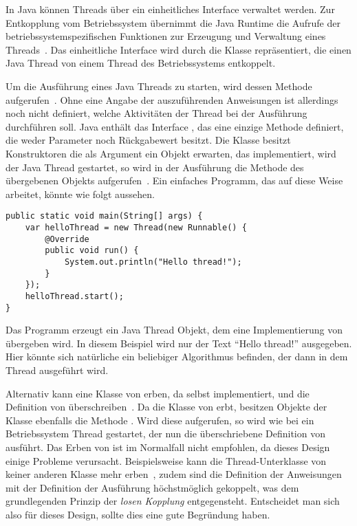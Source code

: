 In Java können Threads über ein einheitliches Interface verwaltet werden. Zur Entkopplung vom Betriebssystem übernimmt die Java Runtime die Aufrufe der betriebssystemspezifischen Funktionen zur Erzeugung und Verwaltung eines Threads~\cite[S.~3]{Friesen2015}. Das einheitliche Interface wird durch die Klasse  repräsentiert, die einen Java Thread von einem Thread des  Betriebssystems entkoppelt. 

Um die Ausführung eines Java Threads zu starten, wird dessen Methode  aufgerufen~\cite[S.~8]{Friesen2015}. Ohne eine Angabe der auszuführenden Anweisungen ist allerdings noch nicht definiert, welche Aktivitäten der Thread bei der Ausführung durchführen soll. Java enthält das Interface , das eine einzige Methode  definiert, die weder Parameter noch Rückgabewert besitzt. Die Klasse  besitzt Konstruktoren die als Argument ein Objekt erwarten, das  implementiert, wird der Java Thread gestartet, so wird in der Ausführung die  Methode des übergebenen Objekts aufgerufen~\cite[S.~3]{Friesen2015}. Ein einfaches Programm, das auf diese Weise arbeitet, könnte wie folgt aussehen.
\begin{lstlisting}
public static void main(String[] args) {
	var helloThread = new Thread(new Runnable() {
		@Override
		public void run() {
			System.out.println("Hello thread!");
		}
	});
	helloThread.start();
}
\end{lstlisting}
Das Programm erzeugt ein Java Thread Objekt, dem eine Implementierung von  übergeben wird. In diesem Beispiel wird nur der Text \enquote{Hello thread!} ausgegeben. Hier könnte sich natürliche ein beliebiger Algorithmus befinden, der dann in dem Thread ausgeführt wird.

Alternativ kann eine Klasse von  erben, da  selbst  implementiert, und die Definition von  überschreiben~\cite[S.~335]{Rauber2006}. Da die Klasse von  erbt, besitzen Objekte der Klasse ebenfalls die Methode . Wird diese aufgerufen, so wird wie bei  ein Betriebssystem Thread gestartet, der nun die überschriebene Definition von  ausführt. Das Erben von  ist im Normalfall nicht empfohlen, da dieses Design einige Probleme verursacht. Beispielsweise kann die Thread-Unterklasse von keiner anderen Klasse mehr erben~\cite[S.~335]{Rauber2006}, zudem sind die Definition der Anweisungen mit der Definition der Ausführung höchstmöglich gekoppelt, was dem grundlegenden Prinzip der \emph{losen Kopplung} entgegensteht. Entscheidet man sich also für dieses Design, sollte dies eine gute Begründung haben.

